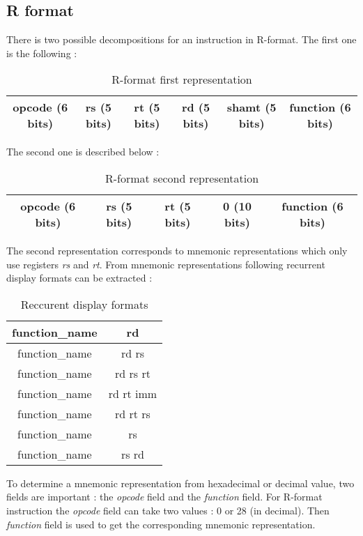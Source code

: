 \subsection*{R format}

	There is two possible decompositions for an instruction in R-format. The first one is the following : 
	
	\begin{table}[H]
	\centering
		\begin{tabular}{|c|c|c|c|c|c|}
			\hline 
	opcode (6 bits) & rs (5 bits) & rt (5 bits) & rd (5 bits) & shamt (5 bits) & function (6 bits) \\ 
			\hline 
		\end{tabular} 
		\caption{R-format first representation}
	\end{table}
	
	The second one is described below :
	\begin{table}[H]
		\centering
		\begin{tabular}{|c|c|c|c|c|}
			\hline 
	opcode (6 bits) & rs (5 bits) & rt (5 bits) & 0 (10 bits) & function (6 bits) \\ 
			\hline 
		\end{tabular} 
		\caption{R-format second representation}
	\end{table}
	
	The second representation corresponds to mnemonic representations which only use registers \textit{rs} and \textit{rt}. From mnemonic representations following recurrent display formats can be extracted :
	
	\begin{table}[H]
	\centering
	\begin{tabular}{|c|c|}
	\hline 
	function\_name & rd \\ 
	\hline 
	function\_name & rd rs \\ 
	\hline 
	function\_name & rd rs rt \\ 
	\hline 
	function\_name & rd rt imm \\ 
	\hline 
	function\_name & rd rt rs \\ 
	\hline 
	function\_name & rs \\ 
	\hline 
	function\_name & rs rd \\ 
	\hline 
	\end{tabular}
	\caption{Reccurent display formats}
	\end{table}
	
	To determine a mnemonic representation from hexadecimal or decimal value, two fields are important : the \textit{opcode} field and the \textit{function} field. For R-format instruction the \textit{opcode} field can take two values : 0 or 28 (in decimal). Then \textit{function} field is used to get the corresponding mnemonic representation.